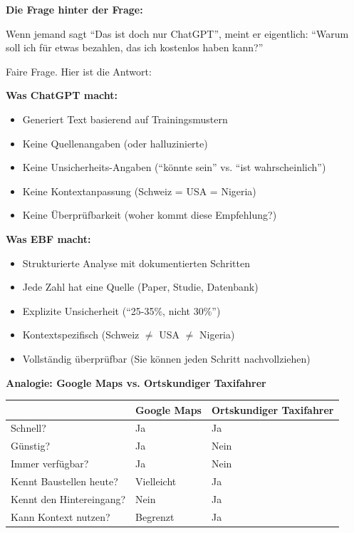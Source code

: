 \begin{tcolorbox}[colback=yellow!5!white, colframe=yellow!75!black,
    title=P1-$\mathcal{P}$-L: Lang (Praxis)]

\textbf{Die Frage hinter der Frage:}

Wenn jemand sagt ``Das ist doch nur ChatGPT'', meint er eigentlich: ``Warum soll ich für etwas bezahlen, das ich kostenlos haben kann?''

Faire Frage. Hier ist die Antwort:

\textbf{Was ChatGPT macht:}
\begin{itemize}[nosep]
    \item Generiert Text basierend auf Trainingsmustern
    \item Keine Quellenangaben (oder halluzinierte)
    \item Keine Unsicherheits-Angaben (``könnte sein'' vs. ``ist wahrscheinlich'')
    \item Keine Kontextanpassung (Schweiz = USA = Nigeria)
    \item Keine Überprüfbarkeit (woher kommt diese Empfehlung?)
\end{itemize}

\textbf{Was EBF macht:}
\begin{itemize}[nosep]
    \item Strukturierte Analyse mit dokumentierten Schritten
    \item Jede Zahl hat eine Quelle (Paper, Studie, Datenbank)
    \item Explizite Unsicherheit (``25-35\%, nicht 30\%'')
    \item Kontextspezifisch (Schweiz $\neq$ USA $\neq$ Nigeria)
    \item Vollständig überprüfbar (Sie können jeden Schritt nachvollziehen)
\end{itemize}

\textbf{Analogie: Google Maps vs. Ortskundiger Taxifahrer}

\begin{center}
\begin{tabular}{lll}
& \textbf{Google Maps} & \textbf{Ortskundiger Taxifahrer} \\
\midrule
Schnell? & Ja & Ja \\
Günstig? & Ja & Nein \\
Immer verfügbar? & Ja & Nein \\
Kennt Baustellen heute? & Vielleicht & Ja \\
Kennt den Hintereingang? & Nein & Ja \\
Kann Kontext nutzen? & Begrenzt & Ja \\
\end{tabular}
\end{center}


\end{tcolorbox}

